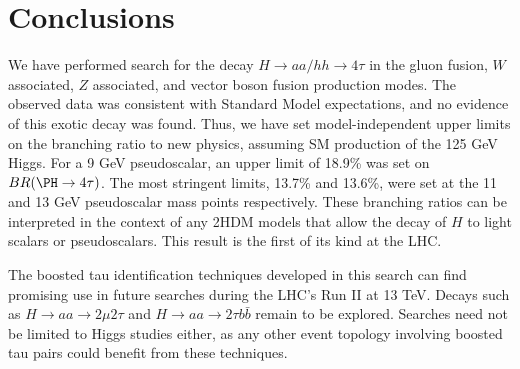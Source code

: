 \chapter{Conclusions\label{sec:conclusions}}

We have performed search for the decay $H\rightarrow$$aa/hh\rightarrow4\tau$ in the gluon fusion, $W$ associated, $Z$ associated, and vector boson fusion production modes. The observed data was consistent with Standard Model expectations, and no evidence of this exotic decay was found. Thus, we have set model-independent upper limits on the branching ratio to new physics, assuming SM production of the 125 GeV Higgs.  For a 9 GeV pseudoscalar, an upper limit of 18.9\% was set on $BR(\PH\to4\tau)$. The most stringent limits, 13.7\% and 13.6\%, were set at the 11 and 13 GeV pseudoscalar mass points respectively. These branching ratios can be interpreted in the context of any 2HDM models that allow the decay of $H$ to light scalars or pseudoscalars. This result is the first of its kind at the LHC.

The boosted tau identification techniques developed in this search can find promising use in future searches during the LHC's Run II at 13 TeV. Decays such as $H\rightarrow$$aa\rightarrow2\mu2\tau$ and $H\rightarrow$$aa\rightarrow2\tau b\bar{b}$ remain to be explored. Searches need not be limited to Higgs studies either, as any other event topology involving boosted tau pairs could benefit from these techniques.